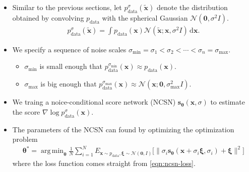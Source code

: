 \documentclass[10pt]{article}
\newcommand{\dee}{\mathrm{d}}
\newcommand{\ve}[1]{\mathbf{#1}}
\newcommand{\mrm}[1]{\mathrm{#1}}
\newcommand{\ves}[1]{\boldsymbol{#1}}
\newcommand{\mcal}[1]{\mathcal{#1}}
\DeclareMathOperator*{\argmin}{arg\,min}
\begin{document}
\begin{itemize}
  \item Similar to the previous sections, let $p_{\mrm{data}}^\sigma(\widetilde{\ve{x}})$ denote the distribution obtained by convolving $p_{\mrm{data}}$ with the spherical Gaussian $\mcal{N}(\ve{0},\sigma^2I)$.
  \begin{align*}
    p^\sigma_{\mrm{data}}(\widetilde{\ve{x}}) 
    = \int p_{\mrm{data}}(\ve{x}) \mcal{N}(\widetilde{\ve{x}};\ve{x}, \sigma^2 I)\, \dee\ve{x}.
  \end{align*}

  \item We specify a sequence of noise scales $\sigma_{\min} = \sigma_1 < \sigma_2 < \dotsb < \sigma_n = \sigma_{\max}$.
  \begin{itemize}
    \item $\sigma_{\min}$ is small enough that $p_{\mrm{data}}^{\sigma_{\min}}(\ve{x}) \approx p_{\mrm{data}}(\ve{x})$.
    
    \item $\sigma_{\max}$ is big enough that $p_{\mrm{data}}^{\sigma_{\max}}(\ve{x}) \approx \mcal{N}(\ve{x};\ve{0},\sigma^2_{\max} I)$.
  \end{itemize}

  \item We traing a noice-conditional score network (NCSN) $\ve{s}_{\ves{\theta}}(\ve{x},\sigma)$ to estimate the score $\nabla \log p_{\mrm{data}}^\sigma(\ve{x})$.
 
  \item The parameters of the NCSN can found by optimizing the optimization problem
  \begin{align*}
    \ves{\theta}^* = \argmin_{\ves{\theta}} \frac{1}{N} \sum_{i=1}^N E_{\ve{x}\sim p_{\mrm{data}}, \ves{\xi} \sim \mcal{N}(\ve{0},I)} \big[ \big\| \sigma_i \ve{s}_{\ves{\theta}}(\ve{x} + \sigma_i \ves{\xi},\sigma_i) + \ves{\xi} \big\|^2 \big] 
  \end{align*}
  where the loss function comes straight from \eqref{eqn:ncsn-loss}.
    

\end{itemize}
\end{document}
